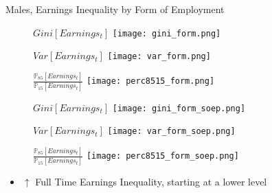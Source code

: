 \documentclass{beamer}
\begin{document}
\begin{frame}{Males, Earnings Inequality by Form of Employment}
\begin{figure}[!t]
\centering
\begin{minipage}[b]{0.32\textwidth}{$Gini[Earnings_t]$}
\centering
\texttt{[image: gini\_form.png]}
\end{minipage}
\begin{minipage}[b]{0.32\textwidth}{$Var[Earnings_t]$}
\centering
\texttt{[image: var\_form.png]}
\end{minipage}
\begin{minipage}[b]{0.32\textwidth}{$\frac{\mathbb{P}_{85}[Earnings_t]}{\mathbb{P}_{15}[Earnings_t]}$}
\centering
\texttt{[image: perc8515\_form.png]}
\end{minipage}
\end{figure}
\begin{figure}[!t]
\centering
\begin{minipage}[b]{0.32\textwidth}{$Gini[Earnings_t]$}
\centering
\texttt{[image: gini\_form\_soep.png]}
\end{minipage}
\begin{minipage}[b]{0.32\textwidth}{$Var[Earnings_t]$}
\centering
\texttt{[image: var\_form\_soep.png]}
\end{minipage}
\begin{minipage}[b]{0.32\textwidth}{$\frac{\mathbb{P}_{85}[Earnings_t]}{\mathbb{P}_{15}[Earnings_t]}$}
\centering
\texttt{[image: perc8515\_form\_soep.png]}
\end{minipage}
\end{figure}
\begin{itemize}
\setlength{\itemsep}{0.7 cm}
\item $\uparrow$ Full Time Earnings Inequality, starting at a lower level
\end{itemize}
\end{frame}
\end{document}
